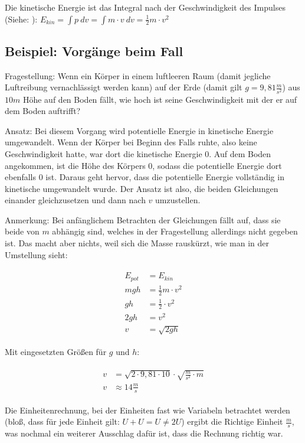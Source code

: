 \begin{NiceToKnow}
	Die kinetische Energie ist das Integral nach der Geschwindigkeit des Impulses (Siehe: ): $E_{kin} = \int p \ dv = \int m \cdot v \ dv = \frac{1}{2} m \cdot v^2$
\end{NiceToKnow}

\subsection{Beispiel: Vorgänge beim Fall}

Fragestellung: Wenn ein Körper in einem luftleeren Raum (damit jegliche Luftreibung vernachlässigt werden kann) auf der Erde (damit gilt $g=9,81\frac{m}{s^2}$) aus $10m$ Höhe auf den Boden fällt, wie hoch ist seine Geschwindigkeit mit der er auf dem Boden auftrifft?

Ansatz: Bei diesem Vorgang wird potentielle Energie in kinetische Energie umgewandelt. Wenn der Körper bei Beginn des Falls ruhte, also keine Geschwindigkeit hatte, war dort die kinetische Energie $0$. Auf dem Boden angekommen, ist die Höhe des Körpers $0$, sodass die potentielle Energie dort ebenfalls $0$ ist. Daraus geht hervor, dass die potentielle Energie vollständig in kinetische umgewandelt wurde. Der Ansatz ist also, die beiden Gleichungen einander gleichzusetzen und dann nach $v$ umzustellen.

Anmerkung: Bei anfänglichem Betrachten der Gleichungen fällt auf, dass sie beide von $m$ abhängig sind, welches in der Fragestellung allerdings nicht gegeben ist. Das macht aber nichts, weil sich die Masse \glqq rauskürzt\grqq , wie man in der Umstellung sieht:

\begin{align}
\begin{split}
	E_{pot} &= E_{kin} \\
	mgh &= \frac{1}{2}m \cdot v^2 \\
	gh &= \frac{1}{2} \cdot v^2 \\
	2gh &= v^2 \\
	v &= \sqrt{2gh}
\end{split}
\end{align}

\noindent Mit eingesetzten Größen für $g$ und $h$:

\begin{align}
\begin{split}
	v &= \sqrt{2 \cdot 9,81 \cdot 10} \cdot \sqrt{\frac{m}{s^2} \cdot m} \\
	v &\approx 14 \frac{m}{s}
\end{split}
\end{align}

Die Einheitenrechnung, bei der Einheiten fast wie Variabeln betrachtet werden (bloß, dass für jede Einheit gilt: $U+U=U \neq 2U$) ergibt die Richtige Einheit $\frac{m}{s}$, was nochmal ein weiterer Ausschlag dafür ist, dass die Rechnung richtig war.




